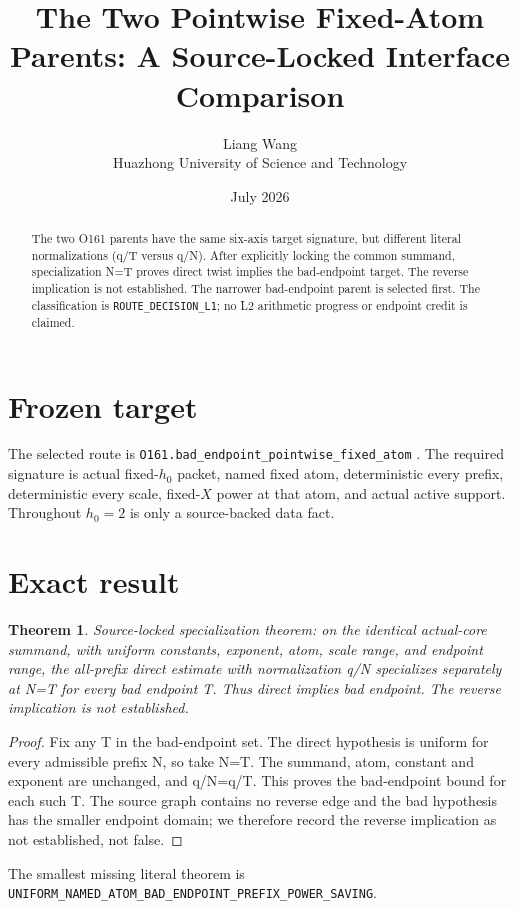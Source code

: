 \documentclass[11pt]{article}
\title{\textbf{The Two Pointwise Fixed-Atom Parents: A Source-Locked Interface Comparison}}
\author{Liang Wang\\Huazhong University of Science and Technology}
\date{July 2026}
\newtheorem{theorem}{Theorem}
\begin{document}
\maketitle
\begin{abstract}
The two O161 parents have the same six-axis target signature, but different literal normalizations (q/T versus q/N).  After explicitly locking the common summand, specialization N=T proves direct twist implies the bad-endpoint target.  The reverse implication is not established. The narrower bad-endpoint parent is selected first.
The classification is \texttt{ROUTE\_\allowbreak{}DECISION\_\allowbreak{}L1}; no L2 arithmetic
progress or endpoint credit is claimed.
\end{abstract}

\section{Frozen target}
The selected route is \texttt{O161.bad\_\allowbreak{}endpoint\_\allowbreak{}pointwise\_\allowbreak{}fixed\_\allowbreak{}atom} \citep{TPC182}.  The required
signature is actual fixed-$h_0$ packet, named fixed atom, deterministic every
prefix, deterministic every scale, fixed-$X$ power at that atom, and actual
active support.  Throughout $h_0=2$ is only a source-backed data fact.

\section{Exact result}
\begin{theorem}
Source-locked specialization theorem: on the identical actual-core summand, with uniform constants, exponent, atom, scale range, and endpoint range, the all-prefix direct estimate with normalization q/N specializes separately at N=T for every bad endpoint T.  Thus direct implies bad endpoint.  The reverse implication is not established.
\end{theorem}
\begin{proof}
Fix any T in the bad-endpoint set.  The direct hypothesis is uniform for every admissible prefix N, so take N=T.  The summand, atom, constant and exponent are unchanged, and q/N=q/T.  This proves the bad-endpoint bound for each such T.  The source graph contains no reverse edge and the bad hypothesis has the smaller endpoint domain; we therefore record the reverse implication as not established, not false.
\end{proof}

The smallest missing literal theorem is
\texttt{UNIFORM\_\allowbreak{}NAMED\_\allowbreak{}ATOM\_\allowbreak{}BAD\_\allowbreak{}ENDPOINT\_\allowbreak{}PREFIX\_\allowbreak{}POWER\_\allowbreak{}SAVING}.
\end{document}
